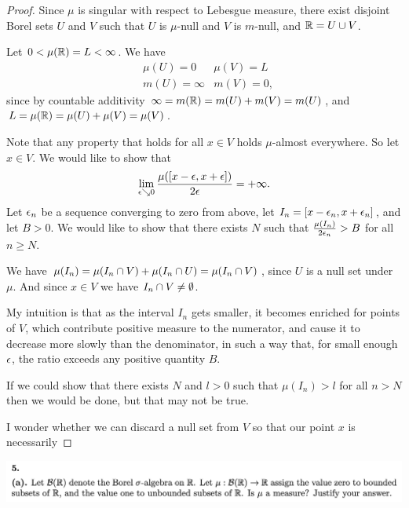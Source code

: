 \begin{proof}
  Since $\mu$ is singular with respect to Lebesgue measure, there exist disjoint Borel sets $U$ and $V$ such
  that $U$ is $\mu$-null and $V$ is $m$-null, and $\mathbb{R} = U \cup V$.

  Let $0 < \mu(\mathbb{R}) = L < \infty$. We have
  \begin{align*}
    &\mu(U) = 0     & \mu(V) = L \\
    &m(U) = \infty & m(V) = 0,
  \end{align*}
  since by countable additivity $\infty = m(\mathbb{R}) = m(U) + m(V) = m(U)$,
  and $L = \mu(\mathbb{R}) = \mu(U) + \mu(V) = \mu(V)$.

  Note that any property that holds for all $x \in V$ holds $\mu$-almost everywhere. So let $x \in V$. We would
  like to show that
  \begin{align*}
    \lim_{\eps \searrow 0} \frac{\mu([x - \eps, x + \eps])}{2\eps} = +\infty.
  \end{align*}
  Let $\epsilon_n$ be a sequence converging to zero from above, let $I_n = [x - \epsilon_n, x + \epsilon_n]$, and
  let $B > 0$. We would like to show that there exists $N$ such that $\frac{\mu(I_n)}{2\epsilon_n} > B$ for
  all $n \geq N$.

  We have $\mu(I_n) = \mu(I_n \cap V) + \mu(I_n \cap U) = \mu(I_n \cap V)$, since $U$ is a null set
  under $\mu$. And since $x \in V$ we have $I_n \cap V \neq \emptyset$.

  My intuition is that as the interval $I_n$ gets smaller, it becomes enriched for points of $V$, which
  contribute positive measure to the numerator, and cause it to decrease more slowly than the denominator, in
  such a way that, for small enough $\epsilon$, the ratio exceeds any positive quantity $B$.

  If we could show that there exists $N$ and $l > 0$ such that $\mu(I_n) > l$ for all $n > N$ then we
  would be done, but that may not be true.

  I wonder whether we can discard a null set from $V$ so that our point $x$ is necessarily
\end{proof}
\newpage
\begin{mdframed}
\includegraphics[width=400pt]{img/analysis--berkeley-202a-final-246a.png}
\end{mdframed}

